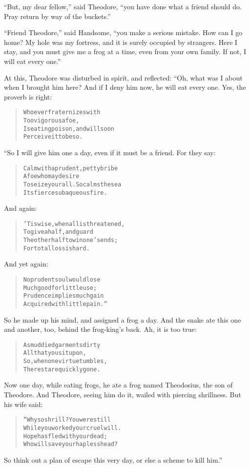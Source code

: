 \documentclass[article, twoside, 14pt]{memoir}
\renewenvironment{verbatim}{%
\begin{quote}%
\vskip -10pt%
\begin{alltt}\normalfont\large}{\end{alltt}%
\end{quote}%
\vskip -10pt
} %
\begin{document}
``But, my dear fellow,'' said Theodore,
``you have done what a friend should do. Pray return by way of the buckets.''

``Friend Theodore,'' said Handsome,
``you make a serious mistake. How can I go home? My hole was my fortress, and it is surely occupied by strangers. Here I stay, and you must give me a frog at a time, even from your own family. If not, I will eat every one.''

At this, Theodore was disturbed in spirit, and reflected: “Oh, what
was I about when I brought him here? And if I deny him now, he will
eat every one. Yes, the proverb is right:

\begin{verbatim}
Whoever fraternizes with
    Too vigorous a foe,
Is eating poison, and will soon
    Perceive it to be so.
\end{verbatim}
“So I will give him one a day, even if it must be a friend. For
they say:

\begin{verbatim}
Calm with a prudent, petty bribe
    A foe who may desire
To seize your all. So calms the sea
    Its fierce subaqueous fire.
\end{verbatim}
And again:

\begin{verbatim}
'Tis wise, when all is threatened,
    To give a half, and guard
The other half to win one's ends;
    For total loss is hard.
\end{verbatim}
And yet again:

\begin{verbatim}
No prudent soul would lose
Much good for little use;
Prudence implies much gain
Acquired with little pain.”
\end{verbatim}
So he made up his mind, and assigned a frog a day. And the snake
ate this one and another, too, behind the frog-king's back. Ah, it
is too true:

\begin{verbatim}
As muddied garments dirty
    All that you sit upon,
So, when one virtue tumbles,
    The rest are quickly gone.
\end{verbatim}
Now one day, while eating frogs, he ate a frog named
Theodosius, the son of Theodore. And Theodore, seeing him do it,
wailed with piercing shrillness. But his wife said:

\begin{verbatim}
“Why so shrill? You were still
While you worked your cruel will.
Hope has fled with your dead;
Who will save your hapless head?
\end{verbatim}
So think out a plan of escape this very day, or else a scheme to
kill him.”
\end{document}
